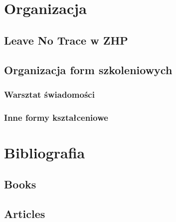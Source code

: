 \documentclass[11pt,fleqn]{book} %
\begin{document}
\chapter{Organizacja}

\section{Leave No Trace w ZHP}

\section{Organizacja form szkoleniowych}
\subsection{Warsztat świadomości}
\subsection{Inne formy kształceniowe}



\chapter*{Bibliografia}
\section*{Books}
\printbibliography[heading=bibempty,type=book]
\section*{Articles}
\printbibliography[heading=bibempty,type=article]


\end{document}
